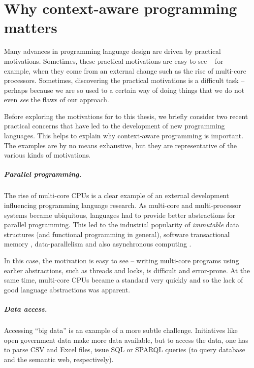 \chapter{Why context-aware programming matters}
\label{ch:intro}

Many advances in programming language design are driven by practical motivations. Sometimes,
these practical motivations are easy to see -- for example, when they come from an external change
such as the rise of multi-core processors. Sometimes, discovering the practical motivations is a
difficult task -- perhaps because we are so used to a certain way of doing things that we do not
even \emph{see} the flaws of our approach.

Before exploring the motivations for to this thesis, we briefly consider two recent practical
concerns that have led to the development of new programming languages. This helps to explain why
context-aware programming is important. The examples are by no means exhaustive, but they
are representative of the various kinds of motivations.

\paragraph{Parallel programming.}

The rise of multi-core CPUs is a clear example of an external development influencing
programming language research. As multi-core and multi-processor systems became ubiquitous,
languages had to provide better abstractions for parallel programming. This led to the industrial
popularity of \emph{immutable} data structures (and functional programming in general), software
transactional memory \cite{app-haskell-stm}, data-parallelism and also asynchronous
computing \cite{app-fsharp-async}.

In this case, the motivation is easy to see -- writing multi-core programs using earlier
abstractions, such as threads and locks, is difficult and error-prone. At the same time,
multi-core CPUs became a standard very quickly and so the lack of good language abstractions
was apparent.

\paragraph{Data access.}

Accessing ``big data'' is an example of a more subtle challenge. Initiatives like open
government data make more data available, but to access the data, one has to parse CSV and 
Excel files, issue SQL or SPARQL queries (to query database and the semantic web, respectively).

